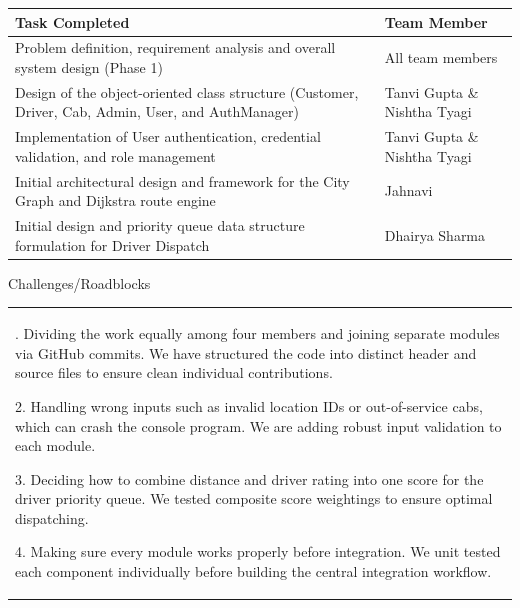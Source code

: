 \documentclass[12pt,a4paper]{article}
\newcommand{\sectiontitle}[1]{%
    {\color{GEUBlue}
    \fontsize{18}{22}\selectfont #1}
}
\newcommand{\answerbox}[2]{%
    \begin{tabularx}{\textwidth}{
        |>{\RaggedRight\arraybackslash}X|}
        \hline
        \parbox[t][#1][t]{\dimexpr\linewidth-12pt\relax}{
            \vspace{5pt}
            \fontsize{11}{13}\selectfont #2
        }\\
        \hline
    \end{tabularx}
}
\begin{document}
\begin{tabularx}{\textwidth}{
|>{\RaggedRight\arraybackslash}X
|>{\RaggedRight\arraybackslash}p{}|
}
\hline

\textbf{Task Completed} &
\textbf{Team Member}\\
\hline

Problem definition, requirement analysis and overall system design (Phase 1) &
All team members \\
\hline

Design of the object-oriented class structure (Customer, Driver, Cab, Admin, User, and AuthManager) &
Tanvi Gupta \& Nishtha Tyagi \\
\hline

Implementation of User authentication, credential validation, and role management &
Tanvi Gupta \& Nishtha Tyagi \\
\hline

Initial architectural design and framework for the City Graph and Dijkstra route engine &
Jahnavi \\
\hline

Initial design and priority queue data structure formulation for Driver Dispatch &
Dhairya Sharma \\
\hline

\end{tabularx}

\vspace{0.65cm}

\sectiontitle{Challenges/Roadblocks}

\vspace{0.05cm}

\vspace{0.18cm}

\answerbox{5.30cm}{
1. Dividing the work equally among four members and joining separate modules via GitHub commits. We have structured the code into distinct header and source files to ensure clean individual contributions.

2. Handling wrong inputs such as invalid location IDs or out-of-service cabs, which can crash the console program. We are adding robust input validation to each module.

3. Deciding how to combine distance and driver rating into one score for the driver priority queue. We tested composite score weightings to ensure optimal dispatching.

4. Making sure every module works properly before integration. We unit tested each component individually before building the central integration workflow.
}
\end{document}
